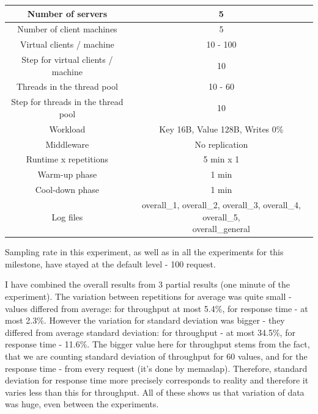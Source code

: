 \documentclass[11pt]{article}
\begin{document}
{\small
\smallskip
\begin{tabular}{|c|c|}
\hline Number of servers & 5 \\ 
\hline Number of client machines & 5 \\ 
\hline Virtual clients / machine & 10 - 100 \\ 
\hline Step for virtual clients / machine & 10 \\ 
\hline Threads in the thread pool & 10 - 60 \\
\hline Step for threads in the thread pool & 10 \\
\hline Workload & Key 16B, Value 128B, Writes 0\% \\
\hline Middleware & No replication \\ 
\hline Runtime x repetitions & 5 min x 1 \\ 
\hline Warm-up phase & 1 min \\
\hline Cool-down phase & 1 min \\

\hline Log files & \parbox[t]{8cm}{overall\_1, overall\_2, overall\_3, overall\_4, overall\_5, \\ overall\_general} \\[3.4ex]
\hline 
\end{tabular} }
\medskip

Sampling rate in this experiment, as well as in all the experiments for this milestone, have stayed at the default level - 100 request.

I have combined the overall results from 3 partial results (one minute of the experiment). The variation between repetitions for average was quite small - values differed from average: for throughput at most 5.4\%, for response time - at most 2.3\%. However the variation for standard deviation was bigger - they differed from average standard deviation: for throughput - at most 34.5\%, for response time - 11.6\%. The bigger value here for throughput stems from the fact, that we are counting standard deviation of throughput for 60 values, and for the response time - from every request (it's done by memaslap). Therefore, standard deviation for response time more precisely corresponds to reality and therefore it varies less than this for throughput. All of these shows us that variation of data was huge, even between the experiments.
\end{document}
